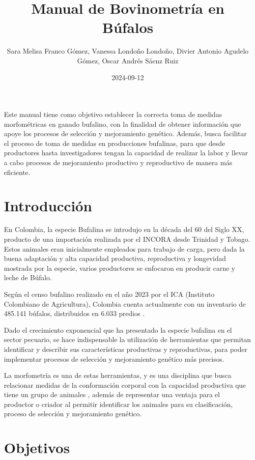 \documentclass[
]{book}
\title{Manual de Bovinometría en Búfalos}
\author{Sara Melisa Franco Gómez, Vanessa Londoño Londoño, Divier Antonio Agudelo Gómez, Oscar Andrés Sáenz Ruiz}
\date{2024-09-12}
\begin{document}
\maketitle

{
\setcounter{tocdepth}{1}
\tableofcontents
}
Este manual tiene como objetivo establecer la correcta
toma de medidas morfométricas en ganado bufalino,
con la finalidad de obtener información que apoye los
procesos de selección y mejoramiento genético.
Además, busca facilitar el proceso de toma de medidas
en producciones bufalinas, para que desde productores hasta
investigadores tengan la capacidad de realizar la labor y llevar
a cabo procesos de mejoramiento productivo y reproductivo de manera más
eficiente.

\chapter{Introducción}\label{introducciuxf3n}

En Colombia, la especie Bufalina se introdujo en la década del 60 del Siglo XX, producto de una importación realizada por el INCORA desde Trinidad y Tobago. Estos animales eran inicialmente empleados para trabajo de carga, pero dada la buena adaptación y alta capacidad productiva, reproductiva y longevidad mostrada por la especie, varios productores se enfocaron en producir carne y leche de Búfalo.

Según el censo bufalino realizado en el año 2023 por el ICA (Instituto Colombiano de Agricultura), Colombia cuenta actualmente con un inventario de 485.141 búfalos, distribuidos en 6.033 predios \citep{ICA2022}.

Dado el crecimiento exponencial que ha presentado la especie bufalina en el sector pecuario, se hace indispensable la utilización de herramientas que permitan identificar y describir sus características productivas y reproductivas, para poder implementar procesos de selección y mejoramiento genético más precisos.

La morfometría es una de estas herramientas, y es una disciplina que busca relacionar medidas de la conformación corporal con la capacidad productiva que tiene un grupo de animales \citep{Cardenas2018}, además de representar una ventaja para el productor o criador al permitir identificar los animales para su clasificación, proceso de selección y mejoramiento genético.

\chapter{Objetivos}\label{objetivos}
\end{document}
